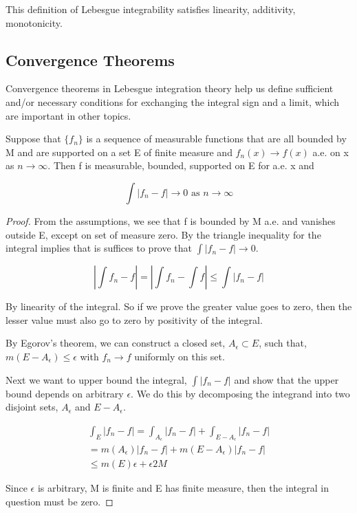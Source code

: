 \documentclass[class=article, crop=false]{standalone}
\begin{document}
		This definition of Lebesgue integrability satisfies linearity, additivity, monotonicity.
	\subsection{Convergence Theorems}
		Convergence theorems in Lebesgue integration theory help us define sufficient and/or necessary conditions for exchanging the integral sign and a limit, which are important in other topics.

		\begin{theorem} 
		\label{thm:bounded_conv}
			Suppose that $\{f_n\}$ is a sequence of measurable functions that are all bounded by M and are supported on a set E of finite measure and $f_n(x) \rightarrow f(x)$ a.e. on x as $n \rightarrow \infty$. Then f is measurable, bounded, supported on E for a.e. x and 

			$$\int |f_n - f| \rightarrow 0 \text{ as } n\rightarrow\infty$$
		\end{theorem}
		\begin{proof}
			From the assumptions, we see that f is bounded by M a.e. and vanishes outside E, except on set of measure zero. By the triangle inequality for the integral implies that is suffices to prove that $\int |f_n - f| \rightarrow 0$. 

			$$| \int f_n - f | = | \int f_n - \int f| \le \int |f_n - f|$$

			By linearity of the integral. So if we prove the greater value goes to zero, then the lesser value must also go to zero by positivity of the integral. 

			By Egorov's theorem, we can construct a closed set, $A_\epsilon \subset E$, such that, $m(E - A_\epsilon) \le \epsilon$ with $f_n \rightarrow f$ uniformly on this set. 

			Next we want to upper bound the integral, $\int |f_n - f|$ and show that the upper bound depends on arbitrary $\epsilon$. We do this by decomposing the integrand into two disjoint sets, $A_\epsilon$ and $E - A_\epsilon$. 

			\begin{align}
				\int_E |f_n - f| = \int_{A_\epsilon} |f_n -f| + \int_{E - A_\epsilon} | f_n - f| \\
				= m(A_\epsilon) |f_n - f| + m(E - A_\epsilon) |f_n - f| \\
				\le m(E) \epsilon + \epsilon 2 M
			\end{align}

			Since $\epsilon$ is arbitrary, M is finite and E has finite measure, then the integral in question must be zero.
		\end{proof}
\end{document}
